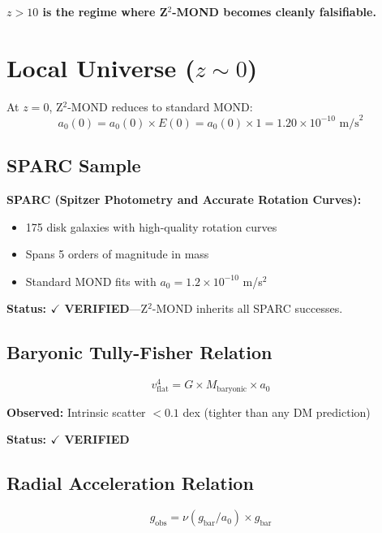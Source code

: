 \documentclass[12pt,a4paper]{article}
\begin{document}
\textbf{$z > 10$ is the regime where Z$^2$-MOND becomes cleanly falsifiable.}

\section{Local Universe ($z \sim 0$)}

At $z = 0$, Z$^2$-MOND reduces to standard MOND:
\begin{equation}
a_0(0) = a_0(0) \times E(0) = a_0(0) \times 1 = 1.20 \times 10^{-10} \text{ m/s}^2
\end{equation}

\subsection{SPARC Sample}

\textbf{SPARC (Spitzer Photometry and Accurate Rotation Curves):}
\begin{itemize}
\item 175 disk galaxies with high-quality rotation curves
\item Spans 5 orders of magnitude in mass
\item Standard MOND fits with $a_0 = 1.2 \times 10^{-10}$ m/s$^2$
\end{itemize}

\textbf{Status: $\checkmark$ VERIFIED}---Z$^2$-MOND inherits all SPARC successes.

\subsection{Baryonic Tully-Fisher Relation}

\begin{equation}
v_{\text{flat}}^4 = G \times M_{\text{baryonic}} \times a_0
\end{equation}

\textbf{Observed:} Intrinsic scatter $< 0.1$ dex (tighter than any DM prediction)

\textbf{Status: $\checkmark$ VERIFIED}

\subsection{Radial Acceleration Relation}

\begin{equation}
g_{\text{obs}} = \nu(g_{\text{bar}}/a_0) \times g_{\text{bar}}
\end{equation}
\end{document}
